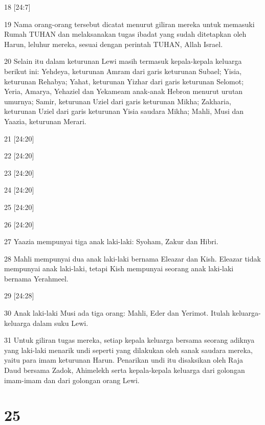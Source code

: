 \par 18 [24:7]
\par 19 Nama orang-orang tersebut dicatat menurut giliran mereka untuk memasuki Rumah TUHAN dan melaksanakan tugas ibadat yang sudah ditetapkan oleh Harun, leluhur mereka, sesuai dengan perintah TUHAN, Allah Israel.
\par 20 Selain itu dalam keturunan Lewi masih termasuk kepala-kepala keluarga berikut ini: Yehdeya, keturunan Amram dari garis keturunan Subael; Yisia, keturunan Rehabya; Yahat, keturunan Yizhar dari garis keturunan Selomot; Yeria, Amarya, Yehaziel dan Yekameam anak-anak Hebron menurut urutan umurnya; Samir, keturunan Uziel dari garis keturunan Mikha; Zakharia, keturunan Uziel dari garis keturunan Yisia saudara Mikha; Mahli, Musi dan Yaazia, keturunan Merari.
\par 21 [24:20]
\par 22 [24:20]
\par 23 [24:20]
\par 24 [24:20]
\par 25 [24:20]
\par 26 [24:20]
\par 27 Yaazia mempunyai tiga anak laki-laki: Syoham, Zakur dan Hibri.
\par 28 Mahli mempunyai dua anak laki-laki bernama Eleazar dan Kish. Eleazar tidak mempunyai anak laki-laki, tetapi Kish mempunyai seorang anak laki-laki bernama Yerahmeel.
\par 29 [24:28]
\par 30 Anak laki-laki Musi ada tiga orang: Mahli, Eder dan Yerimot. Itulah keluarga-keluarga dalam suku Lewi.
\par 31 Untuk giliran tugas mereka, setiap kepala keluarga bersama seorang adiknya yang laki-laki menarik undi seperti yang dilakukan oleh sanak saudara mereka, yaitu para imam keturunan Harun. Penarikan undi itu disaksikan oleh Raja Daud bersama Zadok, Ahimelekh serta kepala-kepala keluarga dari golongan imam-imam dan dari golongan orang Lewi.

\chapter{25}


